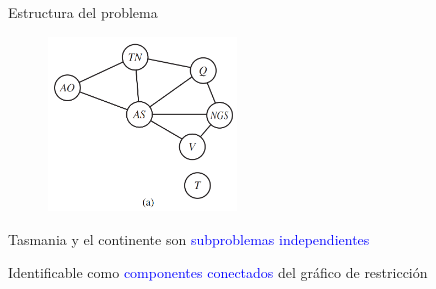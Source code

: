 \begin{frame}{Estructura del problema}
  
    \begin{figure}[t]
\centering
\includegraphics[width=5cm]{32_image_example1.PNG}
\end{figure}

    Tasmania y el continente son \textcolor{blue}{subproblemas independientes}
    \bigskip
    
    Identificable como \textcolor{blue}{componentes conectados} del gráfico de restricción
    
    
    
\end{frame}